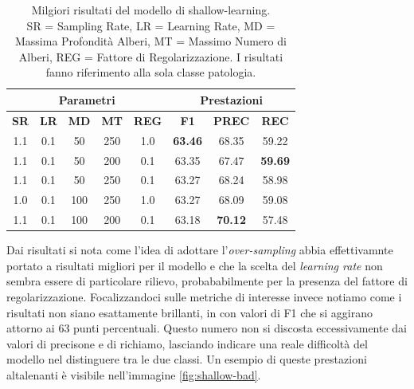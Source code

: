 \begin{table}
    \centering
    \begin{tabular}[h]{||c|c|c|c|c||c|c|c||}
    \hline
    \multicolumn{5}{||c||}{\bf Parametri} & \multicolumn{3}{c||}{\bf Prestazioni} \\
    \hline
    \textbf{SR}  & \textbf{LR}  & \textbf{MD}  & \textbf{MT}  & \textbf{REG} & \textbf{F1} & \textbf{PREC}  & \textbf{REC} \\
    \hline
    \hline
    1.1 & 0.1 & 50  & 250 & 1.0 & {\bf 63.46} & 68.35 & 59.22 \\ 
    1.1 & 0.1 & 50  & 200 & 0.1 & 63.35 & 67.47 & {\bf 59.69} \\ 
    1.1 & 0.1 & 50  & 250 & 0.1 & 63.27 & 68.24 & 58.98 \\ 
    1.0 & 0.1 & 100 & 250 & 1.0 & 63.27 & 68.09 & 59.08 \\ 
    1.1 & 0.1 & 100 & 200 & 0.1 & 63.18 & {\bf 70.12} & 57.48 \\ 
    \hline
    \end{tabular}
    \caption{\label{tab:shallow-learning-results}Milgiori risultati 
    del modello di shallow-learning. \\
    SR = Sampling Rate, LR = Learning Rate, MD = Massima Profondità
    Alberi, MT = Massimo Numero di Alberi, 
    REG = Fattore di Regolarizzazione.
    I risultati fanno riferimento alla sola classe patologia.
    }
\end{table}

Dai risultati si nota come l'idea di adottare
l'{\it over-sampling} abbia effettivamnte
portato a risultati migliori per il modello
e che la scelta del {\it learning rate}
non sembra essere di particolare rilievo,
probababilmente per la presenza del fattore
di regolarizzazione.
Focalizzandoci sulle metriche di interesse
invece notiamo come i risultati non siano
esattamente brillanti, in con valori di 
F1 che si aggirano attorno ai 63
punti percentuali.
Questo numero non si discosta eccessivamente
dai valori di precisone e di richiamo,
lasciando indicare una reale difficoltà
del modello nel distinguere tra le due classi.
Un esempio di queste prestazioni altalenanti
è visibile nell'immagine \ref{fig:shallow-bad}.

